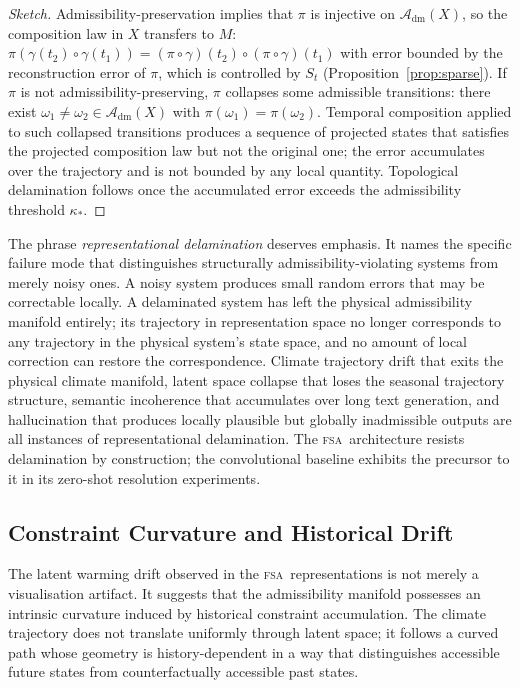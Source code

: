 \documentclass[11pt,a4paper]{article}
\theoremstyle{plain}
\theoremstyle{definition}
\theoremstyle{remark}
\newcommand{\Adm}{\mathcal{A}_{\mathrm{dm}}}
\newcommand{\FSA}{\textup{\textsc{fsa}}}
\begin{document}
\begin{proof}[Sketch]
Admissibility-preservation implies that $\pi$ is injective on $\Adm(X)$,
so the composition law in $X$ transfers to $M$: $\pi(\gamma(t_2) \circ
\gamma(t_1)) = (\pi \circ \gamma)(t_2) \circ (\pi \circ \gamma)(t_1)$
with error bounded by the reconstruction error of $\pi$, which is
controlled by $S_t$ (Proposition~\ref{prop:sparse}). If $\pi$ is not
admissibility-preserving, $\pi$ collapses some admissible transitions:
there exist $\omega_1 \neq \omega_2 \in \Adm(X)$ with
$\pi(\omega_1) = \pi(\omega_2)$. Temporal composition applied to such
collapsed transitions produces a sequence of projected states that
satisfies the projected composition law but not the original one; the
error accumulates over the trajectory and is not bounded by any local
quantity. Topological delamination follows once the accumulated error
exceeds the admissibility threshold $\kappa_*$.
\end{proof}

The phrase \textit{representational delamination} deserves emphasis. It
names the specific failure mode that distinguishes structurally
admissibility-violating systems from merely noisy ones. A noisy system
produces small random errors that may be correctable locally. A delaminated
system has left the physical admissibility manifold entirely; its trajectory
in representation space no longer corresponds to any trajectory in the
physical system's state space, and no amount of local correction can
restore the correspondence. Climate trajectory drift that exits the physical
climate manifold, latent space collapse that loses the seasonal trajectory
structure, semantic incoherence that accumulates over long text generation,
and hallucination that produces locally plausible but globally inadmissible
outputs are all instances of representational delamination. The \FSA\
architecture resists delamination by construction; the convolutional
baseline exhibits the precursor to it in its zero-shot resolution experiments.

\subsection{Constraint Curvature and Historical Drift}

The latent warming drift observed in the \FSA\ representations is not merely
a visualisation artifact. It suggests that the admissibility manifold
possesses an intrinsic curvature induced by historical constraint
accumulation. The climate trajectory does not translate uniformly through
latent space; it follows a curved path whose geometry is history-dependent
in a way that distinguishes accessible future states from counterfactually
accessible past states.
\end{document}
